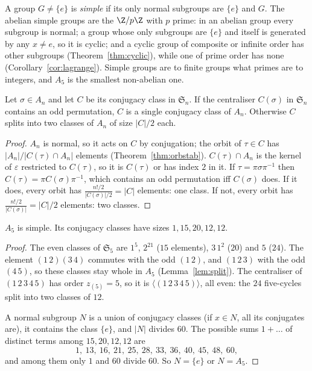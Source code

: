 A group $G\ne\{e\}$ is \emph{simple} if its only normal subgroups are $\{e\}$ and $G$. The abelian simple groups are the $\Z/p\Z$ with $p$ prime: in an abelian group every subgroup is normal; a group whose only subgroups are $\{e\}$ and itself is generated by any $x\ne e$, so it is cyclic; and a cyclic group of composite or infinite order has other subgroups (Theorem~\ref{thm:cyclic}), while one of prime order has none (Corollary~\ref{cor:lagrange}). Simple groups are to finite groups what primes are to integers, and $A_5$ is the smallest non-abelian one.

\begin{lemma}\label{lem:split}
Let $\sigma\in A_n$ and let $C$ be its conjugacy class in $\mathfrak S_n$. If the centraliser $C(\sigma)$ in $\mathfrak S_n$ contains an odd permutation, $C$ is a single conjugacy class of $A_n$. Otherwise $C$ splits into two classes of $A_n$ of size $|C|/2$ each.
\end{lemma}
\begin{proof}
$A_n$ is normal, so it acts on $C$ by conjugation; the orbit of $\tau\in C$ has $|A_n|/|C(\tau)\cap A_n|$ elements (Theorem~\ref{thm:orbstab}). $C(\tau)\cap A_n$ is the kernel of $\varepsilon$ restricted to $C(\tau)$, so it is $C(\tau)$ or has index $2$ in it. If $\tau=\pi\sigma\pi^{-1}$ then $C(\tau)=\pi C(\sigma)\pi^{-1}$, which contains an odd permutation iff $C(\sigma)$ does. If it does, every orbit has $\frac{n!/2}{|C(\sigma)|/2}=|C|$ elements: one class. If not, every orbit has $\frac{n!/2}{|C(\sigma)|}=|C|/2$ elements: two classes.
\end{proof}

\begin{theorem}\label{thm:a5}
$A_5$ is simple. Its conjugacy classes have sizes $1,15,20,12,12$.
\end{theorem}
\begin{proof}
The even classes of $\mathfrak S_5$ are $1^5$, $2^21$ ($15$ elements), $3\,1^2$ ($20$) and $5$ ($24$). The element $(1\,2)(3\,4)$ commutes with the odd $(1\,2)$, and $(1\,2\,3)$ with the odd $(4\,5)$, so these classes stay whole in $A_5$ (Lemma~\ref{lem:split}). The centraliser of $(1\,2\,3\,4\,5)$ has order $z_{(5)}=5$, so it is $\langle(1\,2\,3\,4\,5)\rangle$, all even: the $24$ five-cycles split into two classes of $12$.

A normal subgroup $N$ is a union of conjugacy classes (if $x\in N$, all its conjugates are), it contains the class $\{e\}$, and $|N|$ divides $60$. The possible sums $1+\dots$ of distinct terms among $15,20,12,12$ are
\[
1,\ 13,\ 16,\ 21,\ 25,\ 28,\ 33,\ 36,\ 40,\ 45,\ 48,\ 60,
\]
and among them only $1$ and $60$ divide $60$. So $N=\{e\}$ or $N=A_5$.
\end{proof}

